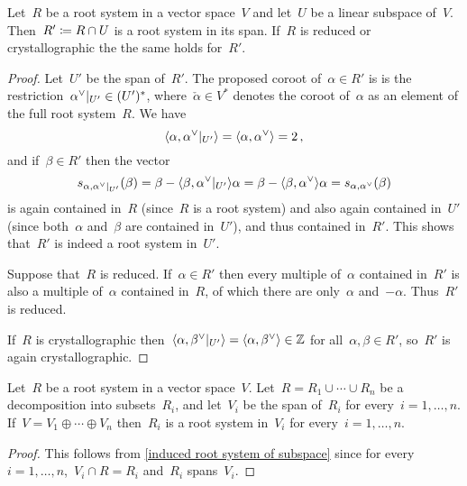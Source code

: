 \begin{lemma}
  \label{induced root system of subspace}
  Let~$R$ be a root system in a vector space~$V$ and let~$U$ be a linear subspace of~$V$.
  Then~$R' \coloneqq R \cap U$ is a root system in its span.
  If~$R$ is reduced or crystallographic the the same holds for~$R'$.
\end{lemma}


\begin{proof}
  Let~$U'$ be the span of~$R'$.
  The proposed coroot of~$\alpha \in R'$ is is the restriction~$\restrict{\check{\alpha}}{U'} \in (U')^*$, where~$\check{\alpha} \in V^*$ denotes the coroot of~$\alpha$ as an element of the full root system~$R$.
  We have
  \[
    \pair{\alpha, \restrict{\check{\alpha}}{U'}}
    =
    \pair{\alpha, \check{\alpha}}
    =
    2 \,,
  \]
  and if~$\beta \in R'$ then the vector
  \[
    s_{\alpha, \restrict{\check{\alpha}}{U'}}(\beta)
    =
    \beta - \pair{\beta, \restrict{\check{\alpha}}{U'}} \alpha
    =
    \beta - \pair{\beta, \check{\alpha}} \alpha
    =
    s_{\alpha,\check{\alpha}}(\beta)
  \]
  is again contained in~$R$ (since~$R$ is a root system) and also again contained in~$U'$ (since both~$\alpha$ and~$\beta$ are contained in~$U'$), and thus contained in~$R'$.
  This shows that~$R'$ is indeed a root system in~$U'$.
  
  Suppose that~$R$ is reduced.
  If~$\alpha \in R'$ then every multiple of~$\alpha$ contained in~$R'$ is also a multiple of~$\alpha$ contained in~$R$, of which there are only~$\alpha$ and~$-\alpha$.
  Thus~$R'$ is reduced.
  
  If~$R$ is crystallographic then~$\pair{\alpha, \restrict{\check{\beta}}{U'}} = \pair{\alpha, \check{\beta}} \in \Integer$ for all~$\alpha, \beta \in R'$, so~$R'$ is again crystallographic.
\end{proof}


\begin{corollary}
  \label{decomposition of root systems}
  Let~$R$ be a root system in a vector space~$V$.
  Let~$R = R_1 \cup \dotsb \cup R_n$ be a decomposition into subsets~$R_i$, and let~$V_i$ be the span of~$R_i$ for every~$i = 1, \dotsc, n$.
  If~$V = V_1 \oplus \dotsb \oplus V_n$ then~$R_i$ is a root system in~$V_i$ for every~$i = 1, \dotsc, n$.
\end{corollary}


\begin{proof}
  This follows from \cref{induced root system of subspace} since for every~$i = 1, \dotsc, n$,~$V_i \cap R = R_i$ and~$R_i$ spans~$V_i$.
\end{proof}


